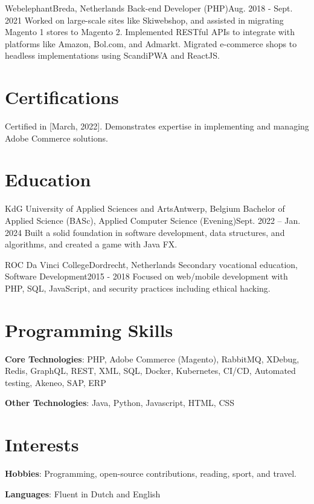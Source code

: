     \resumeSubheading
      {Webelephant}{Breda, Netherlands}
      {Back-end Developer (PHP)}{Aug. 2018 - Sept. 2021}
      \resumeItemListStart
          {Worked on large-scale sites like Skiwebshop, and assisted in migrating Magento 1 stores to Magento 2.}
          {Implemented RESTful APIs to integrate with platforms like Amazon, Bol.com, and Admarkt.}
          {Migrated e-commerce shops to headless implementations using ScandiPWA and ReactJS.}
      \resumeItemListEnd
      
  \resumeSubHeadingListEnd

\section{Certifications}
  \resumeSubHeadingListStart
      {Certified in [March, 2022]. Demonstrates expertise in implementing and managing Adobe Commerce solutions.}
  \resumeSubHeadingListEnd

\section{Education}
  \resumeSubHeadingListStart
    \resumeSubheading
      {KdG University of Applied Sciences and Arts}{Antwerp, Belgium}
      {Bachelor of Applied Science (BASc), Applied Computer Science (Evening)}{Sept. 2022 -- Jan. 2024}
      \resumeItemListStart
          {Built a solid foundation in software development, data structures, and algorithms, and created a game with Java FX.}
      \resumeItemListEnd
      
    \resumeSubheading
      {ROC Da Vinci College}{Dordrecht, Netherlands}
      {Secondary vocational education, Software Development}{2015 - 2018}
      \resumeItemListStart
          {Focused on web/mobile development with PHP, SQL, JavaScript, and security practices including ethical hacking.}
      \resumeItemListEnd
  \resumeSubHeadingListEnd

\section{Programming Skills}
 \resumeSubHeadingListStart
   \item{
     \textbf{Core Technologies}{: PHP, Adobe Commerce (Magento), RabbitMQ, XDebug, Redis, GraphQL, REST, XML, SQL, Docker, Kubernetes, CI/CD, Automated testing, Akeneo, SAP, ERP}
   }
   \item{
     \textbf{Other Technologies}{: Java, Python, Javascript, HTML, CSS}
   }
 \resumeSubHeadingListEnd

\section{Interests}
 \resumeSubHeadingListStart
   \item{
     \textbf{Hobbies}{: Programming, open-source contributions, reading, sport, and travel.}
   }
   \item{
     \textbf{Languages}{: Fluent in Dutch and English}
   }
 \resumeSubHeadingListEnd
